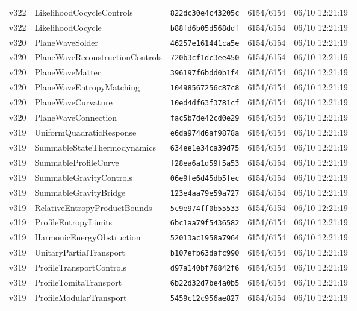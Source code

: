 \documentclass[11pt]{article}
\theoremstyle{definition}\newtheorem{deriv}{Derivation}
\begin{document}
{\begin{longtable}{@{}lllll@{}}
v322 & LikelihoodCocycleControls & \texttt{822dc30e4c43205c} & 6154/6154 & 06/10 12:21:19 \\
v322 & LikelihoodCocycle & \texttt{b88fd6b05d568ddf} & 6154/6154 & 06/10 12:21:19 \\
v320 & PlaneWaveSolder & \texttt{46257e161441ca5e} & 6154/6154 & 06/10 12:21:19 \\
v320 & PlaneWaveReconstructionControls & \texttt{720b3cf1dc3ee450} & 6154/6154 & 06/10 12:21:19 \\
v320 & PlaneWaveMatter & \texttt{396197f6bdd0b1f4} & 6154/6154 & 06/10 12:21:19 \\
v320 & PlaneWaveEntropyMatching & \texttt{10498567256c87c8} & 6154/6154 & 06/10 12:21:19 \\
v320 & PlaneWaveCurvature & \texttt{10ed4df63f3781cf} & 6154/6154 & 06/10 12:21:19 \\
v320 & PlaneWaveConnection & \texttt{fac5b7de42cd0e29} & 6154/6154 & 06/10 12:21:19 \\
v319 & UniformQuadraticResponse & \texttt{e6da974d6af9878a} & 6154/6154 & 06/10 12:21:19 \\
v319 & SummableStateThermodynamics & \texttt{634ee1e34ca39d75} & 6154/6154 & 06/10 12:21:19 \\
v319 & SummableProfileCurve & \texttt{f28ea6a1d59f5a53} & 6154/6154 & 06/10 12:21:19 \\
v319 & SummableGravityControls & \texttt{06e9fe6d45db5fec} & 6154/6154 & 06/10 12:21:19 \\
v319 & SummableGravityBridge & \texttt{123e4aa79e59a727} & 6154/6154 & 06/10 12:21:19 \\
v319 & RelativeEntropyProductBounds & \texttt{5c9e974ff0b55533} & 6154/6154 & 06/10 12:21:19 \\
v319 & ProfileEntropyLimits & \texttt{6bc1aa79f5436582} & 6154/6154 & 06/10 12:21:19 \\
v319 & HarmonicEnergyObstruction & \texttt{52013ac1958a7964} & 6154/6154 & 06/10 12:21:19 \\
v319 & UnitaryPartialTransport & \texttt{b107efb63dafc990} & 6154/6154 & 06/10 12:21:19 \\
v319 & ProfileTransportControls & \texttt{d97a140bf76842f6} & 6154/6154 & 06/10 12:21:19 \\
v319 & ProfileTomitaTransport & \texttt{6b22d32d7be4a0b5} & 6154/6154 & 06/10 12:21:19 \\
v319 & ProfileModularTransport & \texttt{5459c12c956ae827} & 6154/6154 & 06/10 12:21:19 \\

\end{longtable}}
\end{document}
